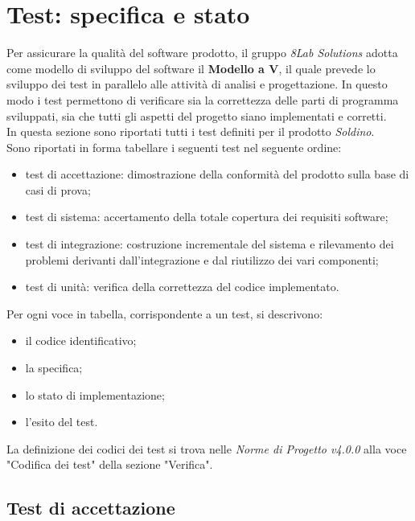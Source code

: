\section{Test: specifica e stato}
Per assicurare la qualità del software prodotto, il gruppo \textit{8Lab Solutions} adotta come modello di sviluppo del software il \textbf{Modello a V\glo}, il quale prevede lo sviluppo dei test in parallelo alle attività di analisi e progettazione.
In questo modo i test permettono di verificare sia la correttezza delle parti di programma sviluppati, sia che tutti gli aspetti del progetto siano implementati e corretti.
\\
In questa sezione sono riportati tutti i test definiti per il prodotto \textit{Soldino}.\\
Sono riportati in forma tabellare i seguenti test nel seguente ordine:
\begin{itemize}
	\item test di accettazione: dimostrazione della conformità del prodotto sulla base di casi di prova;
	\item test di sistema: accertamento della totale copertura dei requisiti software;
	\item test di integrazione: costruzione incrementale del sistema e rilevamento dei problemi derivanti dall'integrazione e dal riutilizzo dei vari componenti;
	\item test di unità: verifica della correttezza del codice implementato.
\end{itemize}
Per ogni voce in tabella, corrispondente a un test, si descrivono:
\begin{itemize}
	\item il codice identificativo;
	\item la specifica;
	\item lo stato di implementazione;
	\item l'esito del test.
\end{itemize}
La definizione dei codici dei test si trova nelle \textit{Norme di Progetto v4.0.0} alla voce "Codifica dei test" della sezione "Verifica".\\

\subsection{Test di accettazione} 
	\renewcommand{\arraystretch}{1.5}
	
